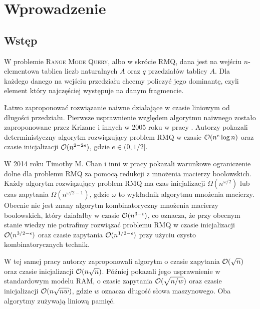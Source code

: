 \section{Wprowadzenie}
\subsection{Wstęp}
W problemie \textsc{Range Mode Query}, albo w skrócie \textsc{RMQ}, dana jest na wejściu $n$-elementowa tablica liczb naturalnych $A$ oraz $q$ przedziałów tablicy $A$. Dla każdego danego na wejściu przedziału chcemy policzyć jego dominantę, czyli element który najczęściej występuje na danym fragmencie.

Łatwo zaproponować rozwiązanie naiwne działające w czasie liniowym od długości przedziału. Pierwsze usprawnienie względem algorytmu naiwnego zostało zaproponowane przez Krizanc i innych w 2005 roku w pracy \cite{kriz05}. Autorzy pokazali deterministyczny algorytm rozwiązujący problem \textsc{RMQ} w czasie $\mathcal{O}(n^e \log n)$ oraz czasie inicjalizacji $\mathcal{O}(n^{2-2e})$, gdzie $e \in (0, 1/2]$.

W 2014 roku Timothy M. Chan i inni w pracy \cite{chan14} pokazali warunkowe ograniczenie dolne dla problemu \textsc{RMQ} za pomocą redukcji z mnożenia macierzy boolowskich. Każdy algorytm rozwiązujący problem \textsc{RMQ} ma czas inicjalizacji $\Omega(n^{\omega/2})$ lub czas zapytania $\Omega(n^{\omega/2-1})$, gdzie $\omega$ to wykładnik algorytmu mnożenia macierzy. Obecnie nie jest znany algorytm kombinatoryczny mnożenia macierzy boolowskich, który działałby w czasie $\mathcal{O}(n^{3-\epsilon})$, co oznacza, że przy obecnym stanie wiedzy nie potrafimy rozwiązać problemu \textsc{RMQ} w czasie inicjalizacji $\mathcal{O}(n^{3/2-\epsilon})$ oraz czasie zapytania $\mathcal{O}(n^{1/2-\epsilon})$ przy użyciu czysto kombinatorycznych technik.

W tej samej pracy autorzy zaproponowali algorytm o czasie zapytania $\mathcal{O}(\sqrt n)$ oraz czasie inicjalizacji $\mathcal{O}(n\sqrt{n})$. Później pokazali jego usprawnienie w standardowym modelu \textsc{RAM}, o czasie zapytania $\mathcal{O}(\sqrt{n/w})$ oraz czasie inicjalizacji $\mathcal{O}(n\sqrt{nw})$, gdzie $w$ oznacza długość słowa maszynowego. Oba algorytmy zużywają liniową pamięć.

